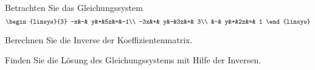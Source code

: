 %


Betrachten Sie das Gleichungssystem
\[
\begin{linsys}{3}
 -x&-& y&+&5z&=&-1\\
-3x&+& y&-&3z&=& 3\\
   &-& y&+&2z&=& 1
\end{linsys}
\]
\begin{teilaufgaben}
\item Berechnen Sie die Inverse der Koeffizientenmatrix.
\item Finden Sie die Lösung des Gleichungssystems mit Hilfe der Inversen.
\end{teilaufgaben}


